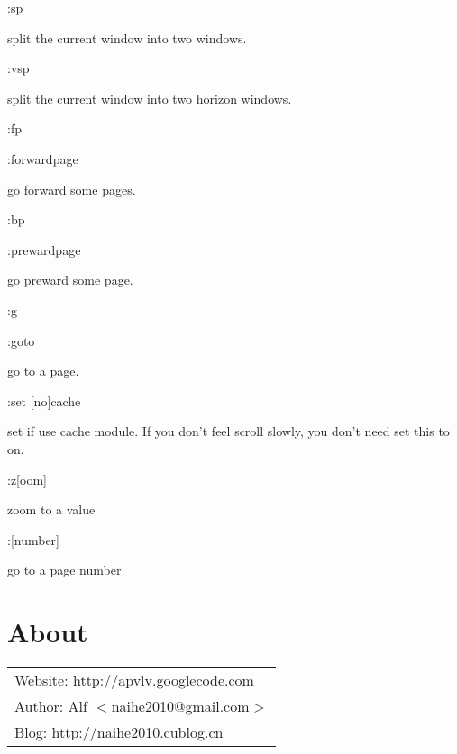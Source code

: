 \documentclass[a4paper,12pt]{article}
\begin{document}
\begin{description}
\item :sp

split the current window into two windows.

\item :vsp

split the current window into two horizon windows.

\item :fp

\item :forwardpage 

go forward some pages.

\item :bp

\item :prewardpage

go preward some page.

\item :g

\item :goto

go to a page.

\item :set [no]cache

set if use cache module. If you don't feel scroll slowly, you don't need set this to on.

\item :z[oom]

zoom to a value

\item :[number]

go to a page number

\end{description}

\newpage

\section{About}

\large
\begin{tabular}{l}
Website: http://apvlv.googlecode.com \\
Author: Alf $<$naihe2010@gmail.com$>$ \\
Blog: http://naihe2010.cublog.cn
\end{tabular}
\end{document}
